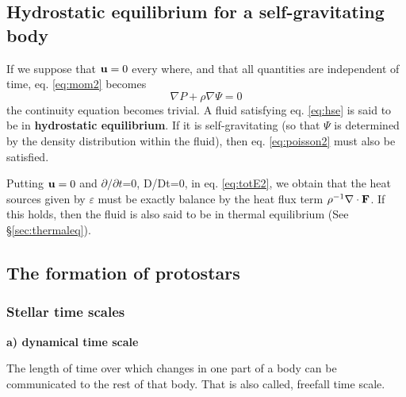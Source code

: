 \bigskip
\subsection{Hydrostatic equilibrium for a self-gravitating body}

If we suppose that ${\bf u}=0$ every where, and that all quantities are independent of time,
eq. \ref{eq:mom2} becomes
\begin{equation}\label{eq:hse}
  \nabla P + \rho \nabla \Psi = 0
\end{equation}
the continuity equation becomes trivial. A fluid satisfying eq. \ref{eq:hse} is said to
be in {\bf hydrostatic equilibrium}. If it is self-gravitating (so that $\Psi$ is determined
by the density distribution within the fluid), then eq. \ref{eq:poisson2} must also be satisfied.

Putting ${\bf u}=0$ and $\partial/\partial t$=0, \ie D/Dt=0, in eq. \ref{eq:totE2}, we obtain
that the heat sources given by $\varepsilon$ must be exactly balance by the heat flux term
$\rho^{-1}\nabla \cdot {\bf F}$. If this holds, then the fluid is also said to be in thermal
equilibrium (See \S \ref{sec:thermaleq}).

\bigskip
\subsection{The formation of protostars}

\subsubsection{Stellar time scales}

\textbf{a) dynamical time scale}

The length of time over which changes in one part of a body can be communicated to the rest of that body.
That is also called, freefall time scale.

